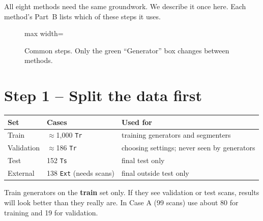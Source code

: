 \documentclass[11pt,a4paper,oneside]{report}
\begin{document}
All eight methods need the same groundwork. We describe it once here. Each method's Part~B lists which of these steps it uses.

\begin{figure}[H]
\centering
\begin{adjustbox}{max width=\linewidth}
\end{adjustbox}
\caption{Common steps. Only the green ``Generator'' box changes between methods.}
\label{fig:prep}
\end{figure}


\section*{Step 1 -- Split the data first}
\begin{center}
\small
\begin{tabular}{lll}
\toprule
\textbf{Set} & \textbf{Cases} & \textbf{Used for} \\
\midrule
Train & $\approx$1{,}000 \texttt{Tr} & training generators and segmenters \\
Validation & $\approx$186 \texttt{Tr} & choosing settings; never seen by generators \\
Test & 152 \texttt{Ts} & final test only \\
External & 138 \texttt{Ext} (needs scans) & final outside test only \\
\bottomrule
\end{tabular}
\end{center}
\begin{caution}
Train generators on the \textbf{train} set only. If they see validation or test scans, results will look better than they really are. In Case A (99 scans) use about 80 for training and 19 for validation.
\end{caution}
\end{document}
